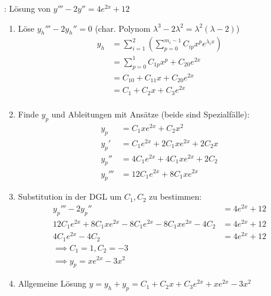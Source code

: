 \Bsp {}: Lösung von $y''' - 2y'' = 4e^{2x} + 12$
\begin{enumerate}
    \item Löse $y_h''' - 2y_h'' = 0$ (char. Polynom $\lambda^3 - 2\lambda^2 = \lambda^2(\lambda - 2)$)
        \vspace{-0.4em}
        \begin{align*}
            y_h &= \sum_{i = 1}^{2} (\sum_{p=0}^{m_i - 1} C_{ip} x^p e^{\lambda_i x}) \\[-0.6em]
                &= \sum_{p = 0}^1 C_{1p} x^p + C_{20} e^{2x} \\[-0.6em]
                &= C_{10} + C_{11}x + C_{20}e^{2x} \\[-0.6em]
                &= C_1 + C_2x + C_3e^{2x} \\[-0.6em]
        \end{align*}
    \item Finde $y_p$ und Ableitungen mit Ansätze (beide sind Spezialfälle):
        \vspace{-1em}
        \begin{align*}
            y_p &= C_1 x e^{2x} + C_2 x^2 \\[-0.4em]
            y_p' &= C_1 e^{2x} + 2 C_1 x e^{2x} + 2C_2 x \\[-0.4em]
            y_p'' &= 4C_1e^{2x} + 4C_1 x e^{2x} + 2C_2 \\[-0.4em]
            y_p''' &= 12 C_1 e^{2x} + 8C_1 x e^{2x}
        \end{align*}
    \item Substitution in der DGL um $C_1, C_2$ zu bestimmen:
        \begin{align*}
            y_p''' - 2y_p'' &= 4e^{2x} + 12 \\[-0.3em]
            12C_1 e^{2x} + 8C_1xe^{2x} - 8C_1e^{2x} - 8C_1xe^{2x} - 4C_2 &= 4e^{2x} + 12 \\[-0.6em]
            4C_1 e^{2x} - 4C_2 &= 4e^{2x} + 12 \\[-0.6em]
            \implies C_1 = 1, C_2 = -3 \hspace{60pt}& \\[-0.6em]
            \implies y_p = x e^{2x} - 3 x^2 \hspace{61pt}&
        \end{align*}
    \item Allgemeine Lösung $y = y_h + y_p = C_1 + C_2x + C_3e^{2x} + x e^{2x} - 3 x^2$
\end{enumerate}

